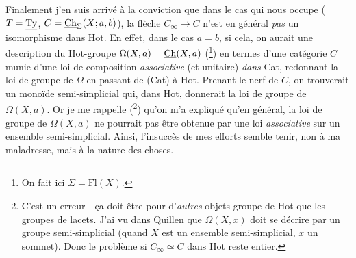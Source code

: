 Finalement j'en suis arrivé à la conviction que dans le cas qui nous occupe ($T = \underline{\mathrm{Ty}}$, $C = \underline{\mathrm{Ch}}_{\Sigma}(X;a,b)$), la flèche $C_{\infty} \longrightarrow C$ n'est en général \textit{pas} un isomorphisme dans Hot. En effet, dans le cas $a = b$, si cela,
on aurait une description du Hot-groupe $\Omega(X,a) = \underline{\mathrm{Ch}}(X,a)$ (\footnote[23]{On fait ici $\Sigma = \mathrm{Fl}(X)$.}) en termes d'une catégorie $C$ munie d'une loi de composition \textit{associative} (et unitaire) \textit{dans} Cat, redonnant la loi de groupe de $\Omega$ en passant de (Cat) à Hot. Prenant le nerf de $C$, on trouverait un monoïde semi-simplicial qui, dans Hot, donnerait la loi de groupe de $\Omega(X,a)$. Or je me rappelle (\footnote[24]{C'est un erreur - ça doit être pour d'\textit{autres} objets groupe de Hot que les groupes de lacets. J'ai vu dans Quillen que $\Omega(X,x)$ doit se décrire par un groupe semi-simplicial (quand $X$ est un ensemble semi-simplicial, $x$ un sommet). Donc le problème si $C_{\infty} \simeq C$ dans Hot reste entier.}) qu'on m'a expliqué qu'en général, la loi de groupe de $\Omega(X,a)$ ne pourrait pas être obtenue par une loi \textit{associative} sur un ensemble semi-simplicial. Ainsi, l'insuccès de mes efforts semble tenir, non à ma maladresse, mais à la nature des choses. %

